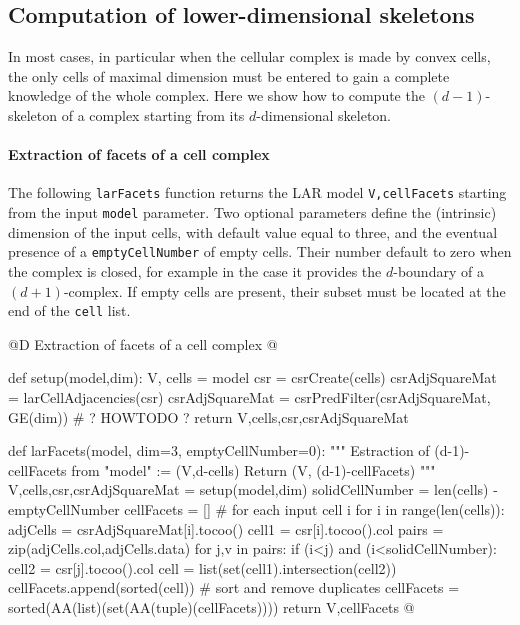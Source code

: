 \documentclass[11pt,oneside]{article}	%
\begin{document}
\subsection{Computation of lower-dimensional skeletons}

In most cases, in particular when the cellular complex is made by convex cells, the only cells of maximal dimension must be entered to gain a complete knowledge of the whole complex.
Here we show how to compute the $(d-1)$-skeleton of a complex starting from its $d$-dimensional skeleton.

\paragraph{Extraction of facets of a cell complex} 

The following \texttt{larFacets} function returns the LAR model \texttt{V,cellFacets} starting from the input \texttt{model} parameter. Two optional parameters define the (intrinsic) dimension of the input cells, with default value equal to three, and the eventual presence of a \texttt{emptyCellNumber} of empty cells. Their number default to zero when the complex is closed, for example in the case it provides the $d$-boundary of a $(d+1)$-complex. If empty cells are present, their subset must be located at the end of the \texttt{cell} list.

@D Extraction of facets of a cell complex
@{def setup(model,dim):
	V, cells = model
	csr = csrCreate(cells)
	csrAdjSquareMat = larCellAdjacencies(csr)
	csrAdjSquareMat = csrPredFilter(csrAdjSquareMat, GE(dim)) # ? HOWTODO ?
	return V,cells,csr,csrAdjSquareMat

def larFacets(model, dim=3, emptyCellNumber=0):
	""" Estraction of (d-1)-cellFacets from "model" := (V,d-cells)
		Return (V, (d-1)-cellFacets)
		"""
	V,cells,csr,csrAdjSquareMat = setup(model,dim)
	solidCellNumber = len(cells) - emptyCellNumber
	cellFacets = []
	# for each input cell i
	for i in range(len(cells)):
		adjCells = csrAdjSquareMat[i].tocoo()
		cell1 = csr[i].tocoo().col
		pairs = zip(adjCells.col,adjCells.data)
		for j,v in pairs:
			if (i<j) and (i<solidCellNumber):
				cell2 = csr[j].tocoo().col
				cell = list(set(cell1).intersection(cell2))
				cellFacets.append(sorted(cell))
	# sort and remove duplicates
	cellFacets = sorted(AA(list)(set(AA(tuple)(cellFacets))))
	return V,cellFacets
@}
\end{document}
